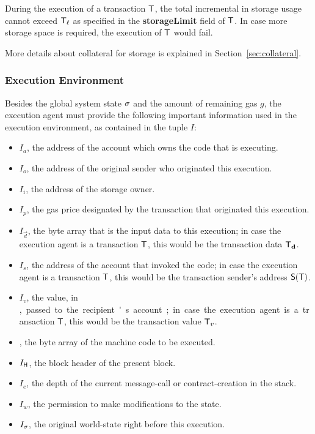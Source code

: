 	During the execution of a transaction $\textsf{T}$, the total incremental in storage usage cannot exceed $\textsf{T}_\ell$ as specified in the \textbf{storageLimit} field of $\textsf{T}$.
	In case more storage space is required, the execution of $\textsf{T}$ would fail.

	More details about collateral for storage is explained in Section~\ref{sec:collateral}.


\subsubsection{Execution Environment}
\label{subsubsec:exe_env}
Besides the global system state $\mathbf{\sigma}$ and the amount of remaining gas $g$, 
the execution agent must provide the following important information used in the execution environment, as contained in the tuple $I$:
\begin{itemize}[nosep]
	\item $I_a$, the address of the account which owns the code that is executing.
	
	\item $I_o$, the address of the original sender who originated this execution.
	
	\item $I_i$, the address of the storage owner.

	\item $I_p$, the gas price designated by the transaction that originated this execution.

	\item $I_{\vec{d}}$, the byte array that is the input data to this execution; in case the execution agent is a transaction $\textsf{T}$, this would be the transaction data $\textsf{T}_{\mathbf{d}}$.

	\item $I_s$, the address of the account that invoked the code; in case the execution agent is a transaction $\textsf{T}$, this would be the transaction sender's address $\mathsf{S}{\left({\textsf{T}} \right)}$.

	 \item $I_v$, the value, in \unit, passed to the recipient's account; in case the execution agent is a transaction $\textsf{T}$, this would be the transaction value $\textsf{T}_v$.

	 \item {}, the byte array of the machine code to be executed.

	 \item $I_{\textsf{H}}$, the block header of the present block.

	 \item $I_e$, the depth of the current message-call or contract-creation in the stack.

	 \item $I_w$, the permission to make modifications to the state.

	 \item $I_{\mathbf{\sigma}}$, the original world-state right before this execution.
\end{itemize}

